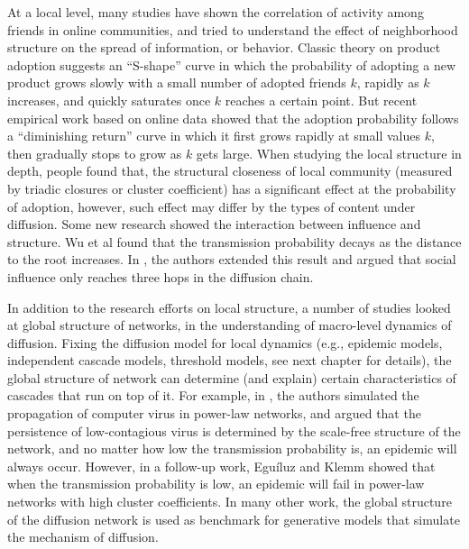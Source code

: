 \documentclass[phd,tocprelim]{cornell}
\begin{document}
At a local level, many studies have shown the correlation of activity among friends in online communities, and tried to understand the effect of neighborhood structure on the spread of information, or behavior. Classic theory on product adoption suggests an ``S-shape'' curve\cite{Bass:1969} in which the probability of adopting a new product grows slowly with a small number of adopted friends $k$, rapidly as $k$ increases, and quickly saturates once $k$ reaches a certain point. But recent empirical work based on online data showed that the adoption probability follows a ``diminishing return'' curve in which it first grows rapidly at small values $k$, then gradually stops to grow as $k$ gets large\cite{Backstrom:2006,Romero-2011}. When studying the local structure in depth, people found that, the structural closeness of local community (measured by triadic closures or cluster coefficient) has a significant effect at the probability of adoption\cite{Backstrom:2006}, however, such effect may differ by the types of content under diffusion\cite{Romero-2011}. Some new research showed the interaction between influence and structure. Wu et al found that the transmission probability decays as the distance to the root increases\cite{wu-2004}. In \cite{Christakis-2007,Christakis-2008,Fowler-2008}, the authors extended this result and argued that social influence only reaches three hops in the diffusion chain. 

In addition to the research efforts on local structure, a number of studies looked at global structure of networks, in the understanding of macro-level dynamics of diffusion. Fixing the diffusion model for local dynamics (e.g., epidemic models, independent cascade models, threshold models, see next chapter for details), the global structure of network can determine (and explain) certain characteristics of cascades that run on top of it. For example,
in \cite{pastor-satorras01}, the authors simulated the propagation of computer
virus in power-law networks, and argued that the persistence of low-contagious
virus is determined by the scale-free structure of the network, and no matter
how low the transmission probability is, an epidemic will always occur.
However, in a follow-up work\cite{Eguiluz-2002}, Egu\'{i}luz and Klemm showed that when the transmission probability is low, an epidemic will fail in power-law networks with high cluster coefficients. In many other work, the global structure of the diffusion network is used as benchmark for generative models that simulate the mechanism of diffusion\cite{Eguiluz-2002,Gruhl-2004,Nowell-2008}.
\end{document}
